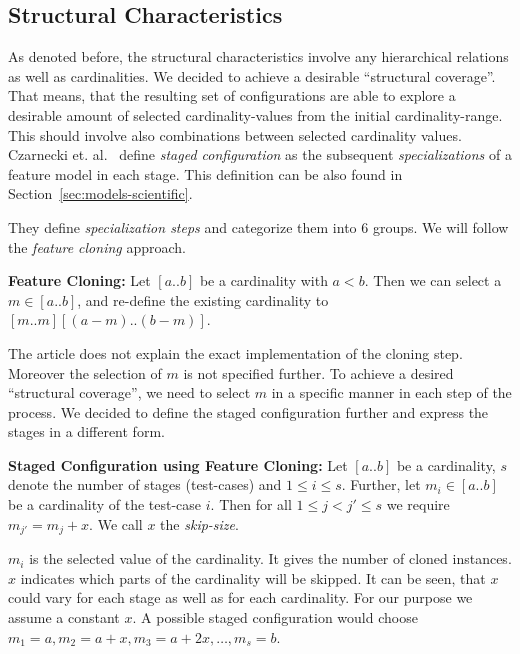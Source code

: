 
\subsection{Structural Characteristics}\label{sec:structure-fm}

As denoted before, the structural characteristics involve any hierarchical relations as well as cardinalities. We decided to achieve a desirable ``structural coverage''. That means, that the resulting set of configurations are able to explore a desirable amount of selected cardinality-values from the initial cardinality-range. This should involve also combinations between selected cardinality values.\\

Czarnecki et. al.~\cite{card-based-feature-models-formalization} define \emph{staged configuration} as the subsequent \emph{specializations} of a feature model in each stage. This definition can be also found in Section~\ref{sec:models-scientific}. 

They define \emph{specialization steps} and categorize them into 6 groups. We will follow the \emph{feature cloning} approach. 

\begin{definition}{\textbf{Feature Cloning:}}
Let $[a..b]$ be a cardinality with $a < b$. Then we can select a $m \in [a..b]$, and re-define the existing cardinality to $[m..m][(a-m)..(b-m)]$. 
\end{definition}

The article does not explain the exact implementation of the cloning step. Moreover the selection of $m$ is not specified further. To achieve a desired ``structural coverage'', we need to select $m$ in a specific manner in each step of the process. We decided to define the staged configuration further and express the stages in a different form. 

\begin{definition}{\textbf{Staged Configuration using Feature Cloning:}}\label{def:staged}
Let $[a..b]$ be a cardinality, $s$ denote the number of stages (test-cases) and $1 \leq i \leq s$. Further, let $m_{i} \in [a..b]$ be a cardinality of the test-case $i$. Then for all $1 \leq j < j' \leq s$ we require $m_{j'} = m_j + x$. We call $x$ the \emph{skip-size}.
\end{definition}

$m_i$ is the selected value of the cardinality. It gives the number of cloned instances. $x$ indicates which parts of the cardinality will be skipped. It can be seen, that $x$ could vary for each stage as well as for each cardinality. For our purpose we assume a constant $x$. 
A possible staged configuration would choose $m_1 = a, m_2 = a + x, m_3 = a + 2x, \ldots, m_s = b$. 

